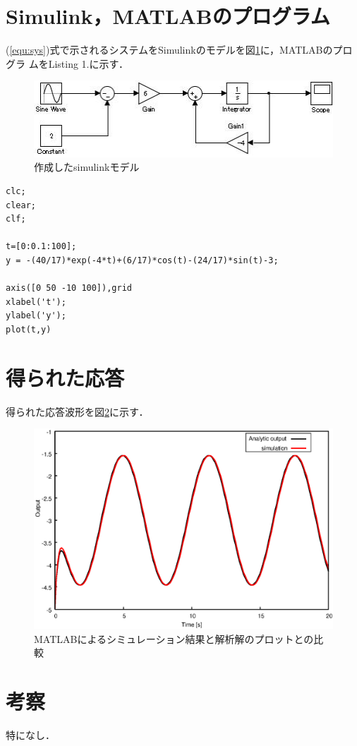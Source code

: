 \documentclass[a4paper,12pt]{jarticle}
\begin{document}
\section{Simulink，MATLABのプログラム}
(\ref{equ:sys})式で示されるシステムをSimulinkのモデルを図\ref{fig:model}に，MATLABのプログラ
ムをListing 1.に示す．
%
\begin{figure}[hbp]
 \begin{center}
  \includegraphics[scale=.7,bb = 0 0 426 109]{fig/model.jpg}
 \end{center}
 \caption{作成したsimulinkモデル}
 \label{fig:model}
\end{figure}
%
\begin{lstlisting}[basicstyle=\ttfamily\footnotesize,frame=single,caption=作成したMATLABのプログラム]
clc;
clear; 
clf; 

t=[0:0.1:100];
y = -(40/17)*exp(-4*t)+(6/17)*cos(t)-(24/17)*sin(t)-3;

axis([0 50 -10 100]),grid 
xlabel('t');  
ylabel('y');
plot(t,y)   
\end{lstlisting}


\section{得られた応答}
%
得られた応答波形を図\ref{fig:text2}に示す．
\begin{figure}[hbp]
 \begin{center}
  \includegraphics[width = 150 mm]{fig/text2.eps}
 \end{center}
 \caption{MATLABによるシミュレーション結果と解析解のプロットとの比較}
 \label{fig:text2}
\end{figure}
%
\section{考察}
特になし．
\end{document}
